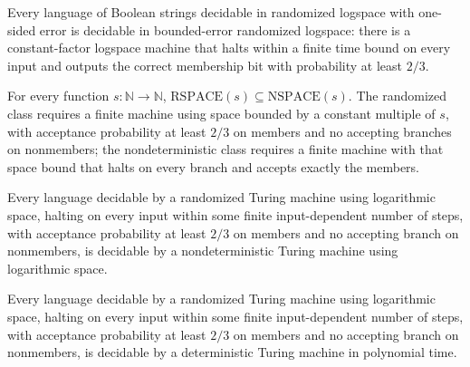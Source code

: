 \begin{theorem}
\label{Randomized.RL_subset_BPL}
\leanok
{}
Every language of Boolean strings decidable in randomized logspace with one-sided error
is decidable in bounded-error randomized logspace: there is a constant-factor logspace
machine that halts within a finite time bound on every input and outputs the correct
membership bit with probability at least $2/3$.
\end{theorem}

\begin{theorem}
\label{Randomized.RSPACE_subset_NSPACE}
\leanok
{}
For every function $s : \mathbb{N} \to \mathbb{N}$, $\mathrm{RSPACE}(s) \subseteq
\mathrm{NSPACE}(s)$. The randomized class requires a finite machine using space bounded
by a constant multiple of $s$, with acceptance probability at least $2/3$ on members and
no accepting branches on nonmembers; the nondeterministic class requires a finite
machine with that space bound that halts on every branch and accepts exactly the
members.
\end{theorem}

\begin{theorem}
\label{Randomized.RL_subset_NL}
\leanok
{}
Every language decidable by a randomized Turing machine using logarithmic space, halting
on every input within some finite input-dependent number of steps, with acceptance
probability at least $2/3$ on members and no accepting branch on nonmembers, is
decidable by a nondeterministic Turing machine using logarithmic space.
\end{theorem}

\begin{theorem}
\label{Randomized.RL_subset_P}
\leanok
{}
Every language decidable by a randomized Turing machine using logarithmic space, halting
on every input within some finite input-dependent number of steps, with acceptance
probability at least $2/3$ on members and no accepting branch on nonmembers, is
decidable by a deterministic Turing machine in polynomial time.
\end{theorem}

